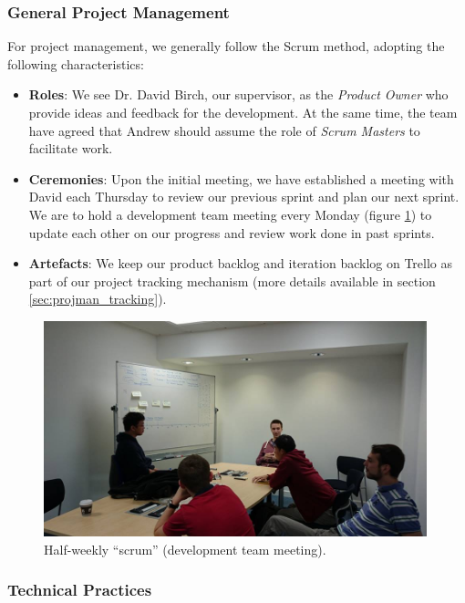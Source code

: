 \documentclass[a4paper, titlepage]{article}
\begin{document}
\subsubsection{General Project Management}

For project management, we generally follow the Scrum method, adopting the
following characteristics:
\begin{itemize}
  \item \textbf{Roles}: We see Dr. David Birch, our supervisor, as the \textit{Product Owner}
        who provide ideas and feedback for the development. At the same time,
        the team have agreed that Andrew should assume the role of
        \textit{Scrum Masters} to facilitate work.
  \item \textbf{Ceremonies}: Upon the initial meeting, we have established a
        meeting with David each Thursday to review our previous sprint 
        and plan our next sprint. We are to hold a development team
        meeting every Monday (figure \ref{fig:projman_scrum}) to update each other 
        on our progress and review work done in past sprints.
  \item \textbf{Artefacts}: We keep our product backlog and iteration backlog on
        Trello as part of our project tracking mechanism (more details
        available in section \ref{sec:projman_tracking}).
\end{itemize}


\begin{figure}[ht]
  \centering
    \includegraphics[width = 0.99\textwidth, trim= 0 0 0 3cm, clip]{./projman/scrum.jpg}
  \caption{Half-weekly ``scrum'' (development team meeting).}
  \label{fig:projman_scrum}
\end{figure}

\subsubsection{Technical Practices}
\end{document}
